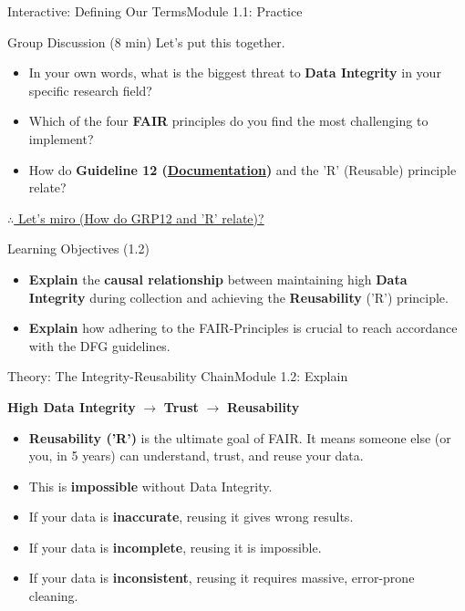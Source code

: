 \begin{frame}{Interactive: Defining Our Terms}{Module 1.1: Practice}
    \begin{block}{Group Discussion (8 min)}
        Let's put this together.
        \begin{itemize}
            \item In your own words, what is the biggest threat to \textbf{Data Integrity} in your specific research field?
            \pause
            \item Which of the four \textbf{FAIR} principles do you find the most challenging to implement?
            \pause
            \item How do \textbf{Guideline 12 (\href{https://wissenschaftliche-integritaet.de/en/code-of-conduct/documentation/}{Documentation})} and the 'R' (Reusable) principle relate?
        \end{itemize}
    \end{block}
    \href{https://miro.com/app/board/uXjVJpI_9Kc=/?moveToWidget=3458764648827295133&cot=14}{$\therefore$ Let's miro (How do GRP12 and ’R’ relate)?}
\end{frame}

\begin{frame}{Learning Objectives (1.2)}
    \begin{itemize}
        \item \textbf{Explain} the \textbf{causal relationship} between maintaining high \textbf{Data Integrity} during collection and achieving the \textbf{Reusability} ('R') principle.
        \item \textbf{Explain} how adhering to the FAIR-Principles is crucial to reach accordance with the DFG guidelines.
    \end{itemize}
\end{frame}

\begin{frame}{Theory: The Integrity-Reusability Chain}{Module 1.2: Explain}
    \begin{center}
        \textbf{High Data Integrity} $\rightarrow$ \textbf{Trust} $\rightarrow$ \textbf{Reusability}
    \end{center}
    \vfill
    \begin{itemize}
        \item \textbf{Reusability ('R')} is the ultimate goal of FAIR. It means someone else (or you, in 5 years) can understand, trust, and reuse your data.
        \pause
        \item This is \textbf{impossible} without Data Integrity.
        \pause
        \item If your data is \textbf{inaccurate}, reusing it gives wrong results.
        \item If your data is \textbf{incomplete}, reusing it is impossible.
        \item If your data is \textbf{inconsistent}, reusing it requires massive, error-prone cleaning.
    \end{itemize}
\end{frame}


